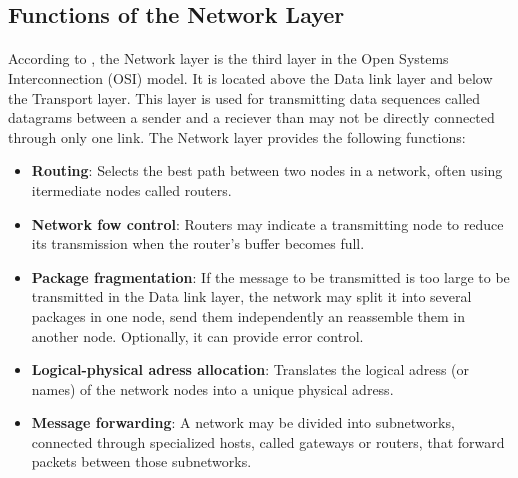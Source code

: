 %
%
%
%
%
%
%

\subsection{Functions of the Network Layer}
\paragraph{}According to \cite{X200}, the Network layer is the third layer in the Open Systems Interconnection (OSI) model. It is located above the Data link layer and below the Transport layer. This layer is used for transmitting data sequences called datagrams between a sender and a reciever than may not be directly connected through only one link. The Network layer provides the following functions:
\begin{itemize}
\item \textbf{Routing}: Selects the best path between two nodes in a network, often using itermediate nodes called routers.
\item \textbf{Network fow control}: Routers may indicate a transmitting node to reduce its transmission when the router's buffer becomes full.
\item \textbf{Package fragmentation}: If the message to be transmitted is too large to be transmitted in the Data link layer, the network may split it into several packages in one node, send them independently an reassemble them in another node. Optionally, it can provide error control.
\item \textbf{Logical-physical adress allocation}: Translates the logical adress (or names) of the network nodes into a unique physical adress.
\item \textbf{Message forwarding}: A network may be divided into subnetworks, connected through specialized hosts, called gateways or routers, that forward packets between those subnetworks.
\end{itemize}

